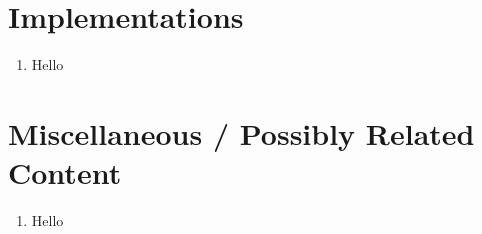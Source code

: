 \documentclass[proposal.tex]{subfiles}
\begin{document}
\section{Implementations}
\begin{enumerate}
\item Hello
\end{enumerate}

\section{Miscellaneous / Possibly Related Content}
\begin{enumerate}
\item Hello
\end{enumerate}
\end{document}
